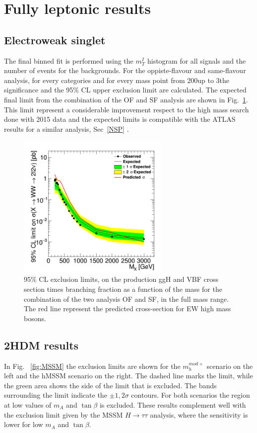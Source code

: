 
\section{Fully leptonic results}

\subsection*{Electroweak singlet}
The final binned fit is performed using the $m_T^I$ histogram for all signals and the number of events for the backgrounds.
For the oppiste-flavour and same-flavour analysis, for every categories and for every mass point from
200\GeV up to 3\TeV the significance  and the 95\% CL
upper exclusion limit are calculated.
The expected final limit from the combination of the OF and SF analysis are shown in Fig.~\ref{fig:lim_OFSF_comb}. 
This limit represent a 	considerable improvement respect to the high mass search done with 2015 data and the expected limits is compatible with the ATLAS results for a similar analysis, Sec~\ref{NSP} .\\
\begin{figure}[htb]
\centering
\includegraphics[width=0.65\textwidth]{../AN/Figs/unblinding/Limits/c2_FullComb_unbl.png}
\caption{95$\%$ CL exclusion limits,  on the production ggH and VBF cross section times branching fraction as a function of the mass for the  combination of the two analysis OF and SF, in the full mass range.   The red  line represent the predicted cross-section for EW high mass bosons.}
\label{fig:lim_OFSF_comb}
\end{figure}


\subsection*{2HDM results}
In Fig. ~\ref{fig:MSSM} the exclusion limits are shown for the $m_h^{mod+}$ scenario on the left and the hMSSM scenario on the right. The dashed line marks the limit, while the green area shows the side of the limit that is excluded. The bands surrounding the limit indicate the $\pm 1,2\sigma$ contours. For both scenarios the region at low values of $m_{A}$ and $\tan\beta$ is excluded. These results complement well with the exclusion limit given by the MSSM $H\rightarrow\tau\tau$ analysis, where the sensitivity is lower for low $m_{A}$ and $\tan\beta$.

